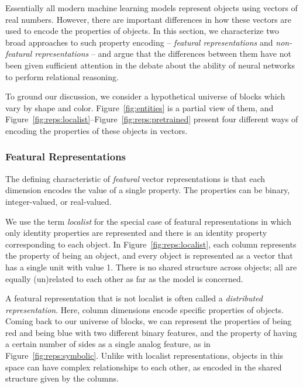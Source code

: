 \documentclass{article}
\newcommand{\Figref}[1]{Figure~\ref{#1}}
\newcommand{\figref}[1]{Figure~\ref{#1}}
\newcommand{\tech}[1]{\emph{#1}}
\begin{document}
Essentially all modern machine learning models represent objects using vectors of real numbers. However, there are important differences in how these vectors are used to encode the properties of objects. In this section, we characterize two broad approaches to such property encoding -- \tech{featural representations} and \tech{non-featural representations} -- and argue that the differences between them have not been given sufficient attention in the debate about the ability of neural networks to perform relational reasoning.

To ground our discussion, we consider a hypothetical universe of blocks which vary by shape and color. \Figref{fig:entities} is a partial view of them, and \figref{fig:reps:localist}--\figref{fig:reps:pretrained} present four different ways of encoding the properties of these objects in vectors.

\subsubsection{Featural Representations}

The defining characteristic of \tech{featural} vector representations is that each dimension encodes the value of a single property. The properties can be binary, integer-valued, or real-valued.

We use the term \tech{localist} for the special case of featural representations in which only identity properties are represented and there is an identity property corresponding to each object. In \figref{fig:reps:localist}, each column represents the property of being an object, and every object is represented as a vector that has a single unit with value 1. There is no shared structure across objects; all are equally (un)related to each other as far as the model is concerned.

A featural representation that is not localist is often called a \tech{distributed representation}. Here, column dimensions encode specific properties of objects. Coming back to our universe of blocks, we can represent the properties of being red and being blue with two different binary features, and the property of having a certain number of sides as a single analog feature, as in \figref{fig:reps:symbolic}. Unlike with localist representations, objects in this space can have complex relationships to each other, as encoded in the shared structure given by the columns.
\end{document}
